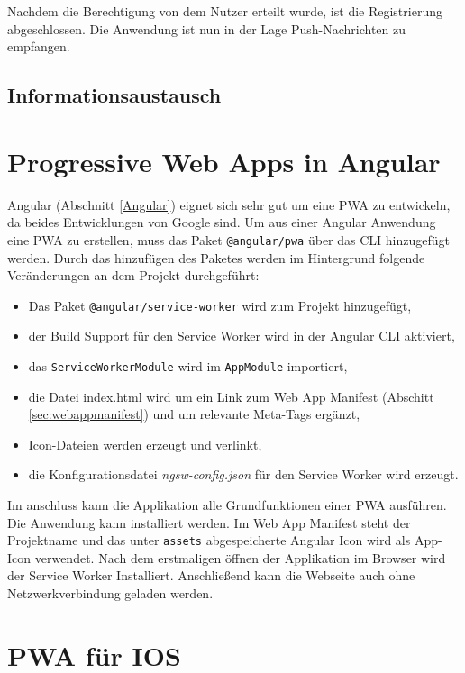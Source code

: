 Nachdem die Berechtigung von dem Nutzer erteilt wurde, ist die Registrierung abgeschlossen. Die Anwendung ist nun in der Lage Push-Nachrichten zu empfangen. 

\subsection{Informationsaustausch}




\section{Progressive Web Apps in Angular}

Angular (Abschnitt \ref{Angular}) eignet sich sehr gut um eine PWA zu entwickeln, da beides Entwicklungen von Google sind. 
Um aus einer Angular Anwendung eine PWA zu erstellen, muss das Paket \texttt{@angular/pwa} über das \ac{CLI} hinzugefügt werden.
Durch das hinzufügen des Paketes werden im Hintergrund folgende Veränderungen an dem Projekt durchgeführt: 
\begin{itemize}
    \item Das Paket \texttt{@angular/service-worker} wird zum Projekt hinzugefügt,
    \item der Build Support für den Service Worker wird in der Angular CLI aktiviert,
    \item das \texttt{ServiceWorkerModule} wird im \texttt{AppModule} importiert,
    \item die Datei index.html wird um ein Link zum Web App Manifest (Abschitt \ref{sec:webappmanifest}) und um relevante Meta-Tags ergänzt,
    \item Icon-Dateien werden erzeugt und verlinkt,
    \item die Konfigurationsdatei \textit{ngsw-config.json} für den Service Worker wird erzeugt. 
\end{itemize}

Im anschluss kann die Applikation alle Grundfunktionen einer PWA ausführen. Die Anwendung kann installiert werden. Im Web App Manifest steht der Projektname und das unter \texttt{assets} abgespeicherte Angular Icon wird als App-Icon verwendet. Nach dem erstmaligen öffnen der Applikation im Browser wird der Service Worker Installiert. Anschließend kann die Webseite auch ohne Netzwerkverbindung geladen werden.  



\section{PWA für IOS}

